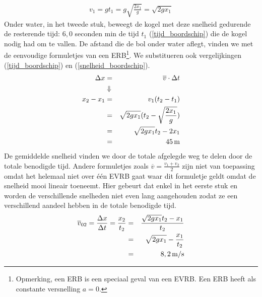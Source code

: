 \documentclass{ximera}
\begin{document}
\begin{enumerate}
{	\begin{eqnarray}
	v_1=gt_1\nonumber=g\sqrt{\frac{2x_1}{g}}\nonumber=\sqrt{2gx_1}\label{snelheid_boordschip}
	\end{eqnarray}
	Onder water, in het tweede stuk, beweegt de kogel met deze snelheid gedurende de resterende tijd: $6,0$ seconden min de tijd $t_1$ (\ref{tijd_boordschip}) die de kogel nodig had om te vallen. De afstand die de bol onder water aflegt, vinden we met de eenvoudige formuletjes van een ERB\footnote{Opmerking, een ERB is een speciaal geval van een EVRB. Een ERB heeft als constante versnelling $a=0$.}. We substitueren ook vergelijkingen (\ref{tijd_boordschip}) en (\ref{snelheid_boordschip}).
	\begin{eqnarray*}
	\Delta x&=&\overline{v}\cdot\Delta t\\
	&\Downarrow&\\
	x_2-x_1&=&v_1(t_2-t_1)\\
	&=&\sqrt{2gx_1}(t_2-\sqrt{\frac{2x_1}{g}})\\
	&=&\sqrt{2gx_1}t_2-2x_1\\
	&=&45\rm\,m
	\end{eqnarray*}
	De gemiddelde snelheid vinden we door de totale afgelegde weg te delen door de totale benodigde tijd. Andere formuletjes zoals $\overline{v}=\frac{v_1+v_2}{2}$ zijn niet van toepassing omdat het helemaal niet over \'e\'en EVRB gaat waar dit formuletje geldt omdat de snelheid mooi lineair toeneemt. Hier gebeurt dat enkel in het eerste stuk en worden de verschillende snelheden niet even lang aangehouden zodat ze een verschillend aandeel hebben in de totale benodigde tijd.
	\begin{eqnarray*}
	\overline{v}_{02}=\frac{\Delta x}{\Delta t}=\frac{x_2}{t_2}&=&\frac{\sqrt{2gx_1}t_2-x_1}{t_2}\\
	&=&\sqrt{2gx_1}-\frac{x_1}{t_2}\\
	&=&8,2\rm\,m/s
	\end{eqnarray*}}
	\end{enumerate}
	
\end{document}
